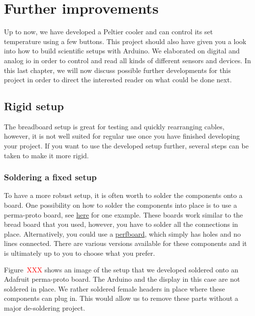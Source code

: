 
\chapter{Further improvements}\label{chap:outlook}

Up to now, we have developed a Peltier cooler and can control its set temperature using a few buttons. This project should also have given you a look into how to build scientific setups with Arduino. We elaborated on digital and analog \ac{io} in order to control and read all kinds of different sensors and devices. In this last chapter, we will now discuss possible further developments for this project in order to direct the interested reader on what could be done next.


\section{Rigid setup}

The breadboard setup is great for testing and quickly rearranging cables, however, it is not well suited for regular use once you have finished developing your project. If you want to use the developed setup further, several steps can be taken to make it more rigid.

\subsection{Soldering a fixed setup}

To have a more robust setup, it is often worth to solder the components onto a board. One possibility on how to solder the components into place is to use a perma-proto board, see \href{https://www.adafruit.com/product/571}{here} for one example. These boards work similar to the bread board that you used, however, you have to solder all the connections in place. Alternatively, you could use a \href{https://en.wikipedia.org/wiki/Perfboard}{perfboard}, which simply has holes and no lines connected. There are various versions available for these components and it is ultimately up to you to choose what you prefer.

Figure~\textcolor{red}{XXX} shows an image of the setup that we developed soldered onto an Adafruit perma-proto board. The Arduino and the display in this case are not soldered in place. We rather soldered female headers in place where these components can plug in. This would allow us to remove these parts without a major de-soldering project.


